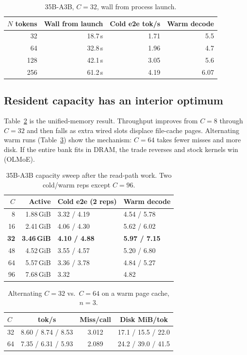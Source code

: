 \begin{table}[t]
\centering
\caption{35B-A3B, $C{=}32$, wall from process launch.}
\label{tab:wall}
\small
\begin{tabular}{@{}rrrr@{}}
\toprule
$N$ tokens & Wall from launch & Cold e2e tok/s & Warm decode \\
\midrule
32 & 18.7\,s & 1.71 & 5.5 \\
64 & 32.8\,s & 1.96 & 4.7 \\
128 & 42.1\,s & 3.05 & 5.6 \\
256 & 61.2\,s & 4.19 & 6.07 \\
\bottomrule
\end{tabular}
\end{table}

\subsection{Resident capacity has an interior optimum}

Table~\ref{tab:csweep} is the unified-memory result. Throughput improves from $C{=}8$ through $C{=}32$ and then falls as extra wired slots displace file-cache pages. Alternating warm runs (Table~\ref{tab:c3264}) show the mechanism: $C{=}64$ takes fewer misses and more disk. If the entire bank fits in DRAM, the trade reverses and stock kernels win (OLMoE).

\begin{table}[t]
\centering
\caption{35B-A3B capacity sweep after the read-path work. Two cold/warm reps except $C{=}96$.}
\label{tab:csweep}
\small
\begin{tabular}{@{}rrll@{}}
\toprule
$C$ & Active & Cold e2e (2 reps) & Warm decode \\
\midrule
8 & 1.88\,GiB & 3.32 / 4.19 & 4.54 / 5.78 \\
16 & 2.41\,GiB & 4.06 / 4.30 & 5.62 / 6.02 \\
\textbf{32} & \textbf{3.46\,GiB} & \textbf{4.10 / 4.88} & \textbf{5.97 / 7.15} \\
48 & 4.52\,GiB & 3.55 / 4.57 & 5.20 / 6.80 \\
64 & 5.57\,GiB & 3.36 / 3.78 & 4.84 / 5.27 \\
96 & 7.68\,GiB & 3.32 & 4.82 \\
\bottomrule
\end{tabular}
\end{table}

\begin{table}[t]
\centering
\caption{Alternating $C{=}32$ vs.\ $C{=}64$ on a warm page cache, $n{=}3$.}
\label{tab:c3264}
\small
\begin{tabular}{@{}lccc@{}}
\toprule
$C$ & tok/s & Miss/call & Disk MiB/tok \\
\midrule
32 & 8.60 / 8.74 / 8.53 & 3.012 & 17.1 / 15.5 / 22.0 \\
64 & 7.35 / 6.31 / 5.93 & 2.089 & 24.2 / 39.0 / 41.5 \\
\bottomrule
\end{tabular}
\end{table}

